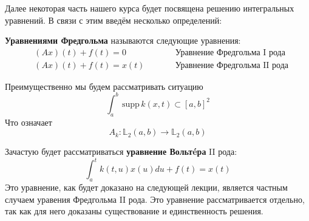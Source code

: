 \documentclass[12pt]{article}
\newcommand{\supp}{\,\text{supp}\,}
\begin{document}
	Далее некоторая часть нашего курса будет посвящена решению интегральных уравнений. В связи с этим введём несколько определений:
	
	\begin{defi}
		\textbf{Уравнениями Фредгольма} называются следующие уравнения:
		\begin{align*}
			&(Ax)(t) + f(t) = 0 &\qquad &\text{Уравнение Фредгольма I рода} \\
			&(Ax)(t) + f(t) = x(t) &\qquad &\text{Уравнение Фредгольма II рода}
		\end{align*}
	\end{defi}
	
	Преимущественно мы будем рассматривать ситуацию 
	$$\int_a^b \supp k(x,t) \subset [a,b]^2$$
	Что означает
	$$A_k: \mathbb{L}_2(a,b) \rightarrow \mathbb{L}_2(a,b)$$
	
	Зачастую будет рассматриваться \textbf{уравнение Вольт\'eра} II рода:
	$$\int_a^t k(t,u) x(u) du + f(t) = x(t)$$
	Это уравнение, как будет доказано на следующей лекции, является частным случаем уравения Фредгольма 
	II рода. Это уравнение рассматривается отдельно, так как для него доказаны существование и единственность
	решения.
\end{document}
